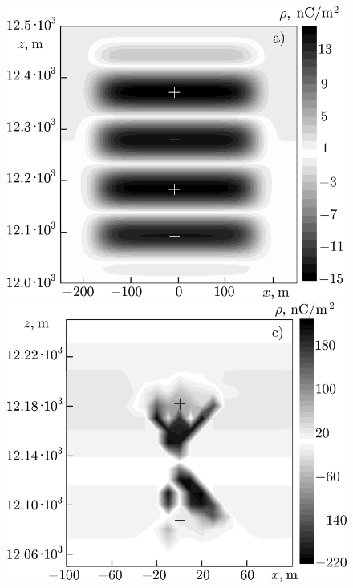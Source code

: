 \documentclass[a4paper, 12pt, onecolumn,singlespacing]{article}
\begin{document}
	\begin{figure}[!h]
		\label{fig:distribuicao_de_cargas}
		\begin{minipage}{0.48\textwidth}
			\centering
			\includegraphics[width=\textwidth]{imagens/15a.png}
			\includegraphics[width=\textwidth]{imagens/16.png}
		\end{minipage}
		\begin{minipage}{0.48\textwidth}
			\centering

\end{minipage}
\end{figure}
\end{document}
